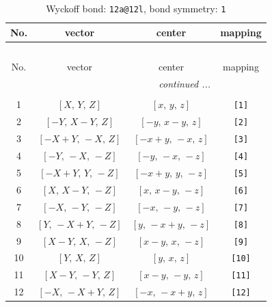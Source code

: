 \documentclass[fleqn,8pt]{jsarticle}
\begin{document}
\begin{longtable}{cccc}
\caption{Wyckoff bond: {\tt 12a@12l}, bond symmetry: {\tt 1}}
 \\
 \hline \hline
No. & vector & center & mapping \\ \hline \endfirsthead

\multicolumn{3}{l}{\tablename\ \thetable{}} \\
 \hline \hline
No. & vector & center & mapping \\ \hline \endhead

 \hline \hline
\multicolumn{3}{r}{\footnotesize\it continued ...} \\ \endfoot

 \hline \hline
\multicolumn{3}{r}{} \\ \endlastfoot

1 & $\left[ X,\, Y,\, Z \right]$ & $\left[ x,\, y,\, z \right]$ & {\tt [1]} \\ \hline
2 & $\left[ - Y,\, X - Y,\, Z \right]$ & $\left[ - y,\, x - y,\, z \right]$ & {\tt [2]} \\ \hline
3 & $\left[ - X + Y,\, - X,\, Z \right]$ & $\left[ - x + y,\, - x,\, z \right]$ & {\tt [3]} \\ \hline
4 & $\left[ - Y,\, - X,\, - Z \right]$ & $\left[ - y,\, - x,\, - z \right]$ & {\tt [4]} \\ \hline
5 & $\left[ - X + Y,\, Y,\, - Z \right]$ & $\left[ - x + y,\, y,\, - z \right]$ & {\tt [5]} \\ \hline
6 & $\left[ X,\, X - Y,\, - Z \right]$ & $\left[ x,\, x - y,\, - z \right]$ & {\tt [6]} \\ \hline
7 & $\left[ - X,\, - Y,\, - Z \right]$ & $\left[ - x,\, - y,\, - z \right]$ & {\tt [7]} \\ \hline
8 & $\left[ Y,\, - X + Y,\, - Z \right]$ & $\left[ y,\, - x + y,\, - z \right]$ & {\tt [8]} \\ \hline
9 & $\left[ X - Y,\, X,\, - Z \right]$ & $\left[ x - y,\, x,\, - z \right]$ & {\tt [9]} \\ \hline
10 & $\left[ Y,\, X,\, Z \right]$ & $\left[ y,\, x,\, z \right]$ & {\tt [10]} \\ \hline
11 & $\left[ X - Y,\, - Y,\, Z \right]$ & $\left[ x - y,\, - y,\, z \right]$ & {\tt [11]} \\ \hline
12 & $\left[ - X,\, - X + Y,\, Z \right]$ & $\left[ - x,\, - x + y,\, z \right]$ & {\tt [12]} \\
\end{longtable}
\end{document}
